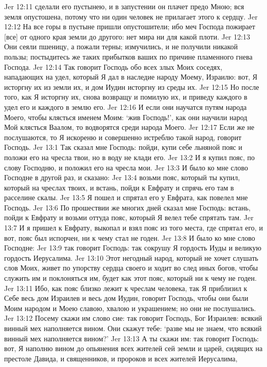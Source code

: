 Jer 12:11  сделали его пустынею, и в запустении он плачет предо Мною; вся земля опустошена, потому что ни один человек не прилагает этого к сердцу.
Jer 12:12  На все горы в пустыне пришли опустошители; ибо меч Господа пожирает [все] от одного края земли до другого: нет мира ни для какой плоти.
Jer 12:13  Они сеяли пшеницу, а пожали терны; измучились, и не получили никакой пользы; постыдитесь же таких прибытков ваших по причине пламенного гнева Господа.
Jer 12:14  Так говорит Господь обо всех злых Моих соседях, нападающих на удел, который Я дал в наследие народу Моему, Израилю: вот, Я исторгну их из земли их, и дом Иудин исторгну из среды их.
Jer 12:15  Но после того, как Я исторгну их, снова возвращу и помилую их, и приведу каждого в удел его и каждого в землю его.
Jer 12:16  И если они научатся путям народа Моего, чтобы клясться именем Моим: `жив Господь!', как они научили народ Мой клясться Ваалом, то водворятся среди народа Моего.
Jer 12:17  Если же не послушаются, то Я искореню и совершенно истреблю такой народ, говорит Господь.
Jer 13:1  Так сказал мне Господь: пойди, купи себе льняной пояс и положи его на чресла твои, но в воду не клади его.
Jer 13:2  И я купил пояс, по слову Господню, и положил его на чресла мои.
Jer 13:3  И было ко мне слово Господне в другой раз, и сказано:
Jer 13:4  возьми пояс, который ты купил, который на чреслах твоих, и встань, пойди к Евфрату и спрячь его там в расселине скалы.
Jer 13:5  Я пошел и спрятал его у Евфрата, как повелел мне Господь.
Jer 13:6  По прошествии же многих дней сказал мне Господь: встань, пойди к Евфрату и возьми оттуда пояс, который Я велел тебе спрятать там.
Jer 13:7  И я пришел к Евфрату, выкопал и взял пояс из того места, где спрятал его, и вот, пояс был испорчен, ни к чему стал не годен.
Jer 13:8  И было ко мне слово Господне:
Jer 13:9  так говорит Господь: так сокрушу Я гордость Иуды и великую гордость Иерусалима.
Jer 13:10  Этот негодный народ, который не хочет слушать слов Моих, живет по упорству сердца своего и ходит во след иных богов, чтобы служить им и поклоняться им, будет как этот пояс, который ни к чему не годен.
Jer 13:11  Ибо, как пояс близко лежит к чреслам человека, так Я приблизил к Себе весь дом Израилев и весь дом Иудин, говорит Господь, чтобы они были Моим народом и Моею славою, хвалою и украшением; но они не послушались.
Jer 13:12  Посему скажи им слово сие: так говорит Господь, Бог Израилев: всякий винный мех наполняется вином. Они скажут тебе: `разве мы не знаем, что всякий винный мех наполняется вином?'
Jer 13:13  А ты скажи им: так говорит Господь: вот, Я наполню вином до опьянения всех жителей сей земли и царей, сидящих на престоле Давида, и священников, и пророков и всех жителей Иерусалима,
